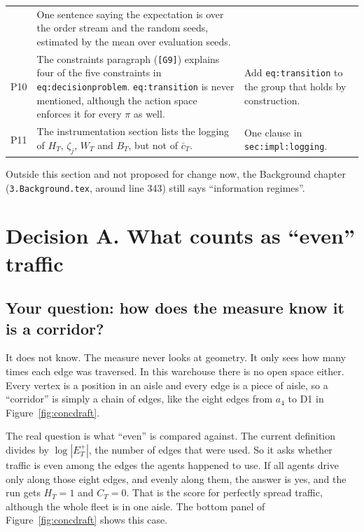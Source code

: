 \documentclass[11pt,a4paper]{article}
\begin{document}
\begin{tabularx}{\linewidth}{@{}lYY@{}}
     & One sentence saying the expectation is over the order stream and
       the random seeds, estimated by the mean over evaluation seeds. \\
  P10 & The constraints paragraph (\texttt{[G9]}) explains four of the
       five constraints in \texttt{eq:decisionproblem}.
       \texttt{eq:transition} is never mentioned, although the action
       space enforces it for every $\pi$ as well.
     & Add \texttt{eq:transition} to the group that holds by
       construction. \\
  P11 & The instrumentation section lists the logging of $H_T$,
       $\zeta_j$, $W_T$ and $B_T$, but not of $\bar c_T$.
     & One clause in \texttt{sec:impl:logging}. \\
  \bottomrule
\end{tabularx}

\medskip
\noindent Outside this section and not proposed for change now, the
Background chapter (\texttt{3.Background.tex}, around line 343) still
says ``information regimes''.

\section{Decision A. What counts as ``even'' traffic}
\label{sec:entropy}

\subsection{Your question: how does the measure know it is a corridor?}

It does not know. The measure never looks at geometry. It only sees how
many times each edge was traversed. In this warehouse there is no open
space either. Every vertex is a position in an aisle and every edge is a
piece of aisle, so a ``corridor'' is simply a chain of edges, like the
eight edges from $a_4$ to D1 in Figure~\ref{fig:concdraft}.

The real question is what ``even'' is compared against. The current
definition divides by $\log|E^{+}_T|$, the number of edges that were used.
So it asks whether traffic is even among the edges the agents happened to
use. If all agents drive only along those eight edges, and evenly along
them, the answer is yes, and the run gets $H_T = 1$ and $C_T = 0$. That is
the score for perfectly spread traffic, although the whole fleet is in one
aisle. The bottom panel of Figure~\ref{fig:concdraft} shows this case.
\end{document}
